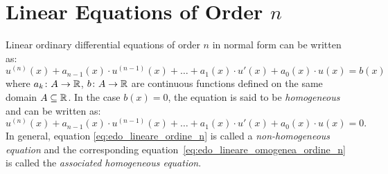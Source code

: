 \section{Linear Equations of Order $n$}
\label{sec:edo_lineari}

Linear ordinary differential equations of order $n$ in normal form can be
written as:
\begin{equation}\label{eq:edo_lineare_ordine_n}
    u^{(n)}(x) + a_{n-1}(x) \cdot u^{(n-1)}(x) + \dots + a_1(x) \cdot u'(x) +
  a_0(x) \cdot u(x) = b(x)
\end{equation}
where $a_k\colon A \to {\mathbb R}$, $b\colon A\to {\mathbb R}$ are continuous functions defined
on the same domain $A\subseteq {\mathbb R}$.
In the case $b(x) = 0$, the equation is said to be \emph{homogeneous}%
and can be written as:
\begin{equation}\label{eq:edo_lineare_omogenea_ordine_n}
    u^{(n)}(x) + a_{n-1}(x) \cdot u^{(n-1)}(x) + \dots + a_1(x)\cdot u'(x) +
  a_0(x)\cdot u(x) = 0.
\end{equation}
In general, equation \eqref{eq:edo_lineare_ordine_n}
is called a \emph{non-homogeneous equation}
and the corresponding equation~\eqref{eq:edo_lineare_omogenea_ordine_n}
is called the \emph{associated homogeneous equation}.

